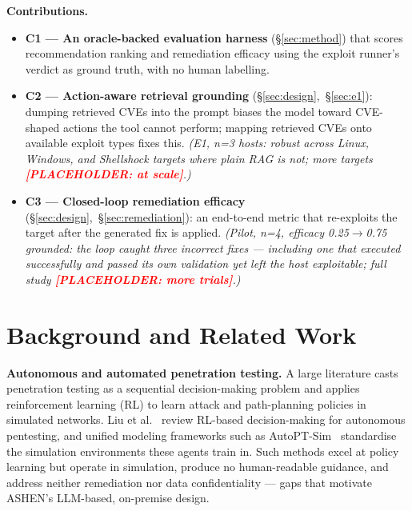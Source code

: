 \documentclass[conference]{IEEEtran}
\newcommand{\todo}[1]{\textcolor{red}{\textbf{[PLACEHOLDER: #1]}}}
\begin{document}
\noindent\textbf{Contributions.}
\begin{itemize}
\item \textbf{C1 --- An oracle-backed evaluation harness} (\S\ref{sec:method})
that scores recommendation ranking and remediation efficacy using the exploit
runner's verdict as ground truth, with no human labelling.
\item \textbf{C2 --- Action-aware retrieval grounding}
(\S\ref{sec:design},~\S\ref{sec:e1}): dumping retrieved CVEs into the prompt
biases the model toward CVE-shaped actions the tool cannot perform; mapping
retrieved CVEs onto available exploit types fixes this. \emph{(E1, n=3 hosts:
robust across Linux, Windows, and Shellshock targets where plain RAG is not; more
targets \todo{at scale}.)}
\item \textbf{C3 --- Closed-loop remediation efficacy}
(\S\ref{sec:design},~\S\ref{sec:remediation}): an end-to-end metric that
re-exploits the target after the generated fix is applied. \emph{(Pilot, n=4,
efficacy 0.25$\rightarrow$0.75 grounded: the loop caught three incorrect fixes --- including one that executed
successfully and passed its own validation yet left the host exploitable; full
study \todo{more trials}.)}
\end{itemize}

\section{Background and Related Work}
\textbf{Autonomous and automated penetration testing.} A large literature casts
penetration testing as a sequential decision-making problem and applies
reinforcement learning (RL) to learn attack and path-planning policies in
simulated networks. Liu et al.~\cite{rlreview} review RL-based decision-making for
autonomous pentesting, and unified modeling frameworks such as
AutoPT-Sim~\cite{autoptsim} standardise the simulation environments these agents
train in. Such methods excel at policy learning but operate in simulation, produce
no human-readable guidance, and address neither remediation nor data
confidentiality --- gaps that motivate ASHEN's LLM-based, on-premise design.
\end{document}
